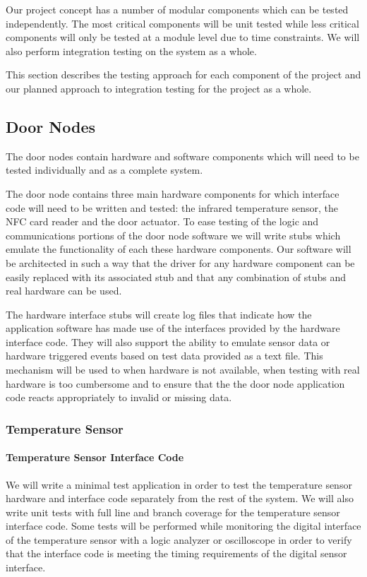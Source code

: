 Our project concept has a number of modular components which can be tested
independently. The most critical components will be unit tested while less
critical components will only be tested at a module level due to time
constraints. We will also perform integration testing on the system as a whole.

This section describes the testing approach for each component of the project
and our planned approach to integration testing for the project as a whole.

\subsection{Door Nodes}

The door nodes contain hardware and software components which will need to be
tested individually and as a complete system.

The door node contains three main hardware components for which interface code
will need to be written and tested: the infrared temperature sensor, the NFC
card reader and the door actuator. To ease testing of the logic and
communications portions of the door node software we will write stubs which
emulate the functionality of each these hardware components. Our software will
be architected in such a way that the driver for any hardware component can be
easily replaced with its associated stub and that any combination of stubs and
real hardware can be used.

The hardware interface stubs will create log files that indicate how the
application software has made use of the interfaces provided by the hardware
interface code. They will also support the ability to emulate sensor data or
hardware triggered events based on test data provided as a text file. This
mechanism will be used to when hardware is not available, when testing with real
hardware is too cumbersome and to ensure that the the door node application code
reacts appropriately to invalid or missing data.

\subsubsection{Temperature Sensor}

\paragraph{Temperature Sensor Interface Code}
We will write a minimal test application in order to test the temperature sensor
hardware and interface code separately from the rest of the system. We will also
write unit tests with full line and branch coverage for the temperature sensor
interface code. Some tests will be performed while monitoring the digital
interface of the temperature sensor with a logic analyzer or oscilloscope in
order to verify that the interface code is meeting the timing requirements of
the digital sensor interface.

